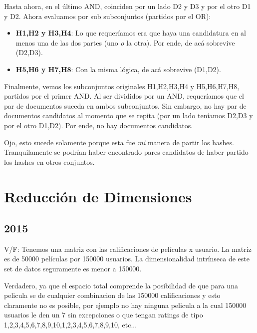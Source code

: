 \documentclass[a4paper]{article}
\newenvironment{enunciado}[3]{%
    \vspace{\baselineskip}
    \tcolorbox[beamer,%
    noparskip,breakable,
    colback=LightGreen,colframe=DarkGreen,%
    colbacklower=LimeGreen!75!LightGreen,%
    title=\small Enunciado: Año #1\, Cuatrimestre #2\, Oportunidad #3]}%
    {\endtcolorbox}
\newenvironment{criterio}[3]{%
    \tcolorbox[beamer,%
    noparskip,breakable,
    colback=LightCoral,colframe=DarkRed,%
    colbacklower=Tomato!75!LightCoral,%
    title=\small Criterio de Corrección: Año #1\, Cuatrimestre #2\, Oportunidad #3]}%
    {\endtcolorbox}
\begin{document}
    Hasta ahora, en el último AND, coinciden por un lado D2 y D3 y por el otro D1 y D2. Ahora evaluamos por sub subconjuntos (partidos por el OR):

    \begin{itemize}
    \item \textbf{H1,H2 y H3,H4}: Lo que requeríamos era que haya una candidatura en al menos una de las dos partes (uno \textit{o} la otra). Por ende, de acá sobrevive (D2,D3).

    \item \textbf{H5,H6 y H7,H8}: Con la misma lógica, de acá sobrevive (D1,D2).
    \end{itemize}

    Finalmente, vemos los subconjuntos originales H1,H2,H3,H4 y H5,H6,H7,H8, partidos por el primer AND. Al ser divididos por un AND, requeríamos que el par de documentos suceda en ambos subconjuntos. Sin embargo, no hay par de documentos candidatos al momento que se repita (por un lado teníamos D2,D3 y por el otro D1,D2). Por ende, no hay documentos candidatos.

    Ojo, esto sucede solamente porque esta fue \textit{mí} manera de partir los hashes. Tranquilamente se podrían haber encontrado pares candidatos de haber partido los hashes en otros conjuntos.

    \section{Reducción de Dimensiones}

    \subsection{2015}

    \begin{enunciado}{2015}{2}{1}
        V/F: Tenemos   una   matriz   con   las calificaciones   de   películas   x usuario.   La   matriz   es   de   50000 películas por 150000 usuarios. La dimensionalidad intrínseca de este set de datos seguramente es menor a 150000.
    \end{enunciado}
    
    \begin{criterio}{2015}{2}{1}
        Verdadero, ya que el espacio total comprende la posibilidad de que para una pelicula se de cualquier combinacion de las 150000 calificaciones y esto claramente no es posible, por ejemplo no hay ninguna pelicula a la cual 150000 usuarios le den un 7 sin excepciones o que tengan ratings de tipo 1,2,3,4,5,6,7,8,9,10,1,2,3,4,5,6,7,8,9,10, etc... 
    \end{criterio}
\end{document}
